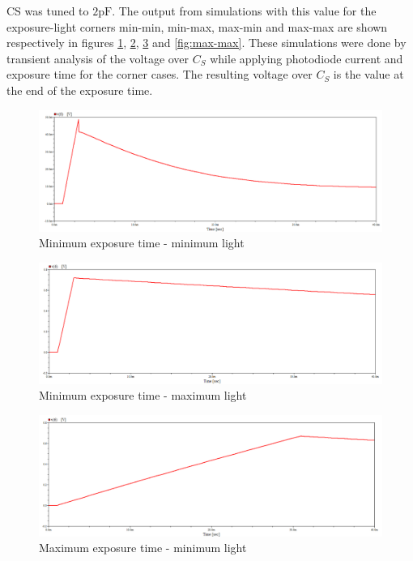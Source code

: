 CS was tuned to $2 \mathrm{pF}$. The output from simulations with this value for the exposure-light corners min-min, min-max, max-min and max-max are shown respectively in figures \ref{fig:min-min}, \ref{fig:min-max}, \ref{fig:max-min} and \ref{fig:max-max}. These simulations were done by transient analysis of the voltage over $C_S$ while applying photodiode current and exposure time for the corner cases. The resulting voltage over $C_S$ is the value at the end of the exposure time.

\begin{figure}
    \centering
    \includegraphics[width=\textwidth]{graphs/minExp_minLight.png}
    \caption{Minimum exposure time - minimum light}
    \label{fig:min-min}
\end{figure}

\begin{figure}
    \centering
    \includegraphics[width=\textwidth]{graphs/minExp_maxLight.png}
    \caption{Minimum exposure time - maximum light}
    \label{fig:min-max}
\end{figure}

\begin{figure}
    \centering
    \includegraphics[width=\textwidth]{graphs/maxExp_minLight.png}
    \caption{Maximum exposure time - minimum light}
    \label{fig:max-min}
\end{figure}

